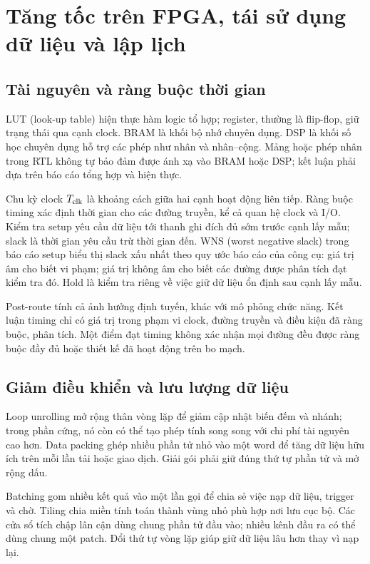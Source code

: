 \section{Tăng tốc trên FPGA, tái sử dụng dữ liệu và lập lịch}
\subsection{Tài nguyên và ràng buộc thời gian}
LUT (look-up table) hiện thực hàm logic tổ hợp; register, thường là flip-flop, giữ trạng thái qua cạnh clock. BRAM là khối bộ nhớ chuyên dụng. DSP là khối số học chuyên dụng hỗ trợ các phép như nhân và nhân--cộng. Mảng hoặc phép nhân trong RTL không tự bảo đảm được ánh xạ vào BRAM hoặc DSP; kết luận phải dựa trên báo cáo tổng hợp và hiện thực.

Chu kỳ clock $T_{\rm clk}$ là khoảng cách giữa hai cạnh hoạt động liên tiếp. Ràng buộc timing xác định thời gian cho các đường truyền, kể cả quan hệ clock và I/O. Kiểm tra setup yêu cầu dữ liệu tới thanh ghi đích đủ sớm trước cạnh lấy mẫu; slack là thời gian yêu cầu trừ thời gian đến. WNS (worst negative slack) trong báo cáo setup biểu thị slack xấu nhất theo quy ước báo cáo của công cụ: giá trị âm cho biết vi phạm; giá trị không âm cho biết các đường được phân tích đạt kiểm tra đó. Hold là kiểm tra riêng về việc giữ dữ liệu ổn định sau cạnh lấy mẫu.

Post-route tính cả ảnh hưởng định tuyến, khác với mô phỏng chức năng. Kết luận timing chỉ có giá trị trong phạm vi clock, đường truyền và điều kiện đã ràng buộc, phân tích. Một điểm đạt timing không xác nhận mọi đường đều được ràng buộc đầy đủ hoặc thiết kế đã hoạt động trên bo mạch.

\subsection{Giảm điều khiển và lưu lượng dữ liệu}
Loop unrolling mở rộng thân vòng lặp để giảm cập nhật biến đếm và nhánh; trong phần cứng, nó còn có thể tạo phép tính song song với chi phí tài nguyên cao hơn. Data packing ghép nhiều phần tử nhỏ vào một word để tăng dữ liệu hữu ích trên mỗi lần tải hoặc giao dịch. Giải gói phải giữ đúng thứ tự phần tử và mở rộng dấu.

Batching gom nhiều kết quả vào một lần gọi để chia sẻ việc nạp dữ liệu, trigger và chờ. Tiling chia miền tính toán thành vùng nhỏ phù hợp nơi lưu cục bộ. Các cửa sổ tích chập lân cận dùng chung phần tử đầu vào; nhiều kênh đầu ra có thể dùng chung một patch. Đổi thứ tự vòng lặp giúp giữ dữ liệu lâu hơn thay vì nạp lại.

